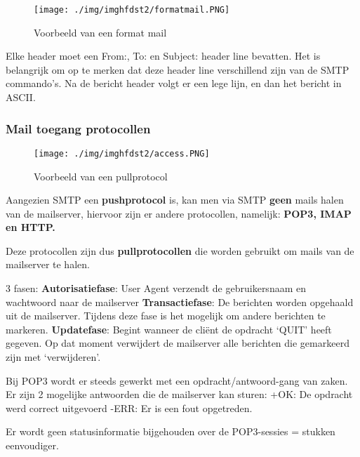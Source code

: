 \begin{figure}[h]
\centering
\texttt{[image: ./img/imghfdst2/formatmail.PNG]}
\caption{Voorbeeld van een format mail }
\label{fig:format mail}
\end{figure}

\noindent Elke header moet een From:, To: en Subject: header line bevatten. Het is belangrijk om op te merken dat deze header line verschillend zijn van de SMTP commando’s. Na de bericht header volgt er een lege lijn, en dan het bericht in ASCII.

\subsubsection{Mail toegang protocollen}

\begin{figure}[h]
\centering
\texttt{[image: ./img/imghfdst2/access.PNG]}
\caption{Voorbeeld van een pullprotocol }
\label{fig:pullprotocol}
\end{figure}

\noindent Aangezien SMTP een \textbf{pushprotocol} is, kan men via SMTP \textbf{geen} mails halen van de mailserver, hiervoor zijn er andere protocollen, namelijk: \textbf{POP3, IMAP en HTTP.}

\noindent Deze protocollen zijn dus \textbf{pullprotocollen} die worden gebruikt om mails van de mailserver te halen.



3 fasen:
\be
\itf \textbf{Autorisatiefase}: User Agent verzendt de gebruikersnaam en wachtwoord naar de mailserver
\itf \textbf{Transactiefase}: De berichten worden opgehaald uit de mailserver. Tijdens deze fase is het mogelijk om andere berichten te markeren.
\itf \textbf{Updatefase}: Begint wanneer de cliënt de opdracht ‘QUIT’ heeft gegeven. Op dat moment verwijdert de mailserver alle berichten die gemarkeerd zijn met ‘verwijderen’.
\ee

\noindent Bij POP3 wordt er steeds gewerkt met een opdracht/antwoord-gang van zaken. Er zijn 2 mogelijke antwoorden die de mailserver kan sturen:
\bi
\itf +OK: De opdracht werd correct uitgevoerd
\itf -ERR: Er is een fout opgetreden.
\ei

\noindent Er wordt geen statusinformatie bijgehouden over de POP3-sessies = stukken eenvoudiger.


